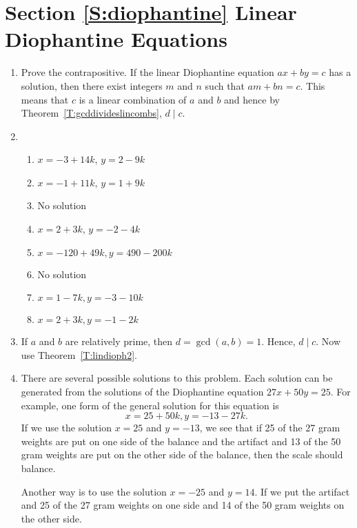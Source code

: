 \section*{Section \ref{S:diophantine} Linear Diophantine Equations}

\begin{enumerate}
\item Prove the contrapositive.  If the linear Diophantine equation $ax + by = c$ has a solution, then there exist integers $m$ and $n$ such that $am + bn = c$.  This means that $c$ is a linear combination of $a$ and $b$ and hence by Theorem~\ref{T:gcddivideslincombs}, $d \mid c$.

\item \begin{enumerate}
\item $x = -3 + 14k$, \quad  $y = 2 - 9k$

\item $x = -1 + 11k$, \quad  $y = 1 + 9k$

\item No solution

\item $x = 2+3k$, \quad  $y = -2-4k$

\item $x = -120 + 49k, y = 490 - 200k$

\item No solution

\item $x = 1 - 7k, y = -3 - 10k$

\item $x = 2 + 3k, y = -1 - 2k$
\end{enumerate}

\item If $a$ and $b$ are relatively prime, then $d = \gcd \left( a, b \right) = 1$.  Hence, $d \mid c$.  Now use Theorem~\ref{T:lindioph2}.

\item There are several possible solutions to this problem.  Each solution can be generated from the solutions of the Diophantine equation $27x + 50y = 25$.  For example, one form of the general solution for this equation is
\[
x = 25 + 50k, y = -13 - 27k.
\]
If we use the solution $x = 25$ and $y = -13$, we see that if 25 of the 27 gram weights are put on one side of the balance and the artifact and 13 of the  50 gram weights are put on the other side of the balance, then the scale should balance.

Another way is to use the solution $x = -25$ and $y = 14$.  If we put the artifact and 25 of the 27 gram weights on one side and 14 of the 50 gram weights on the other side.


\end{enumerate}
